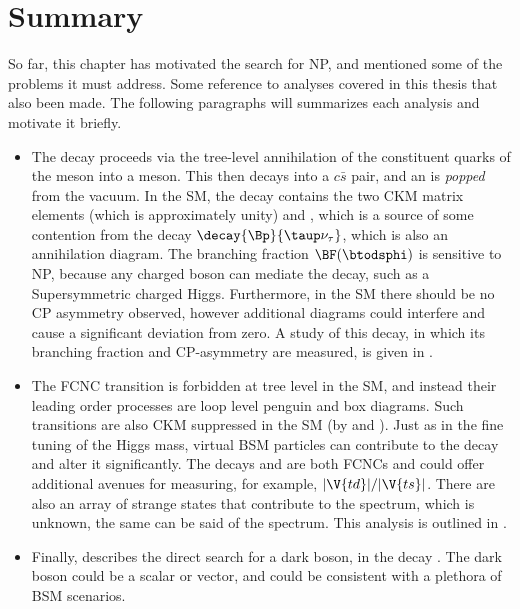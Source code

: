 \section{Summary}

So far, this chapter has motivated the search for NP, and mentioned some of the problems it must
address.
Some reference to analyses covered in this thesis that also been made.
The following paragraphs will summarizes each analysis and motivate it briefly.
\vspace{8pt}
\begin{flushright}
  \begin{minipage}{0.95\textwidth}
    \begin{itemize}
      \setlength{\itemsep}{8pt}
      \item[\Chap{ch:dsphi}]
        The decay \btodsphi proceeds via the tree-level annihilation of the constituent quarks of the \Bp
        meson into a \Wp meson.
        This then decays into a $c\bar s$ pair, and an \ssbar is \emph{popped} from the vacuum.
        In the SM, the decay contains the two CKM matrix elements  (which is approximately unity) and
        , which is a source of some contention from the decay $\decay{\Bp}{\taup\nu_\tau}$, which
        is also an annihilation diagram.
        The branching fraction $\BF(\btodsphi)$ is sensitive to NP, because any charged boson can mediate
        the decay, such as a Supersymmetric charged Higgs.
        Furthermore, in the SM there should be no CP asymmetry observed, however additional diagrams could
        interfere and cause a significant deviation from zero.
        A study of this decay, in which its branching fraction and CP-asymmetry are measured, is given in
        .
      \item[\Chap{ch:hhh}]
        The FCNC transition  is forbidden at tree level in the SM, and instead their
        leading order processes are loop level penguin and box diagrams.
        Such transitions are also CKM suppressed in the SM (by  and ).
        Just as in the fine tuning of the Higgs mass, virtual BSM particles can contribute to the decay and
        alter it significantly.
        The decays \btokpipimumu and \btophikmumu are both  FCNCs and could offer
        additional avenues for measuring, for example, $|\V{td}|/|\V{ts}|$.
        There are also an array of strange states that contribute to the \kpipi spectrum, which is unknown,
        the same can be said of the \phik spectrum.
        This analysis is outlined in .
      \item[\Chap{ch:db}]
        Finally,  describes the direct search for a dark boson, \decay{\db}{\mumu} in the
        decay \decay{\Bd}{\Kstarent\mumu}.
        The dark boson could be a scalar or vector, and could be consistent with a plethora of BSM
        scenarios.
    \end{itemize}
  \end{minipage}
\end{flushright}








